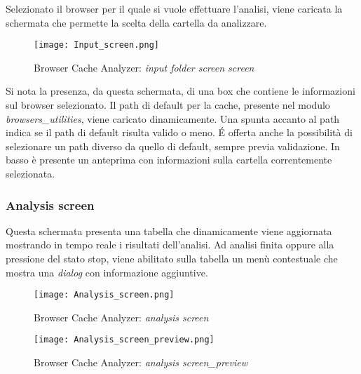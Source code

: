 Selezionato il browser per il quale si vuole effettuare l'analisi, viene caricata la schermata che permette la scelta della cartella da analizzare. 

\begin{figure}[htpb]
	\begin{center}
		\texttt{[image: Input\_screen.png]}
	\end{center}
	\caption[Browser Cache Analyzer: \textit{input folder screen}]{Browser Cache Analyzer: \textit{input folder screen screen}}
\end{figure}

Si nota la presenza, da questa schermata, di una box che contiene le informazioni sul browser selezionato. Il path di default per la cache, presente nel modulo \textit{browsers\_utilities}, viene caricato dinamicamente. Una spunta accanto al path indica se il path di default risulta valido o meno. \'E offerta anche la possibilità di selezionare un path diverso da quello di default, sempre previa validazione. In basso è presente un anteprima con informazioni sulla cartella correntemente selezionata.

\subsubsection{Analysis screen}
Questa schermata presenta una tabella che dinamicamente viene aggiornata mostrando in tempo reale i risultati dell'analisi. Ad analisi finita oppure alla pressione del stato stop, viene abilitato sulla tabella un menù contestuale che mostra una \textit{dialog} con informazione aggiuntive. 

\begin{figure}[htpb]
	\begin{center}
		\texttt{[image: Analysis\_screen.png]}
	\end{center}
	\caption[Browser Cache Analyzer: \textit{analysis screen}]{Browser Cache Analyzer: \textit{analysis screen}}
\end{figure}

\begin{figure}[htpb]
	\begin{center}
		\texttt{[image: Analysis\_screen\_preview.png]}
	\end{center}
	\caption[Browser Cache Analyzer: \textit{analysis screen\_preview}]{Browser Cache Analyzer: \textit{analysis screen\_preview}}
\end{figure}

\clearpage

